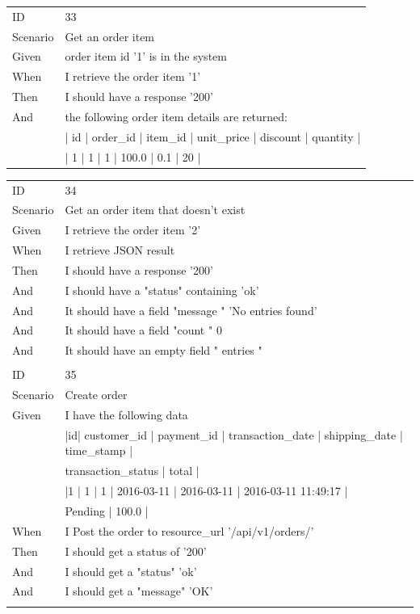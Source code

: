 \documentclass{report}
\begin{document}
\begin{tabular}{ l l }
ID 			& 33\\
Scenario		& Get an order item \\
Given 		& order item id '1' is in the system \\
When 		& I retrieve the order item '1' \\
Then 		& I should have a response '200' \\
And 			& the following order item details are returned: \\
    			& | id | order\_id | item\_id | unit\_price | discount | quantity | \\
    			& | 1 | 1        | 1          | 100.0      | 0.1      | 20       |
\end{tabular}
\newpage

\begin{tabular}{ l l }
ID 			& 34\\
Scenario		& Get an order item that doesn't exist\\
Given 		& I retrieve the order item '2'\\
When 		& I retrieve JSON result\\
Then 		& I should have a response '200'\\
And 			& I should have a "status" containing 'ok' \\
And 			& It should have a field "message " 'No entries found' \\
And 			& It should have a field "count " 0 \\
And 			& It should have an empty field " entries " \\ \\
ID 			& 35\\
Scenario		& Create order \\
Given 		& I have the following data \\
    			& |id| customer\_id | payment\_id | transaction\_date | shipping\_date | time\_stamp          | \\
    			& transaction\_status | total | \\
    			& |1 | 1           | 1          | 2016-03-11       | 2016-03-11    | 2016-03-11 11:49:17 | \\
    			& Pending            | 100.0 | \\
When 		& I Post the order to resource\_url  '/api/v1/orders/'\\
Then 		& I should get a status of '200'\\
And 			& I should get a "status" 'ok'\\
And 			& I should get a "message" 'OK'\\ \\

\end{tabular}
\end{document}
